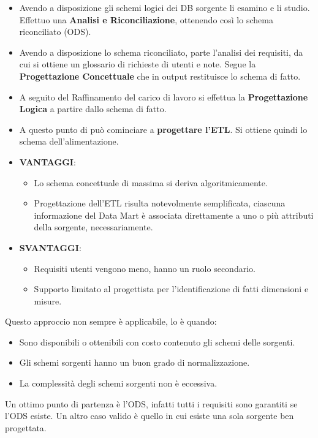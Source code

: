 \begin{itemize}
	\item Avendo a disposizione gli schemi logici dei DB sorgente li esamino e li studio. Effettuo una \textbf{Analisi e Riconciliazione}, ottenendo così lo schema riconciliato (ODS).
	\item Avendo a disposizione lo schema riconciliato, parte l'analisi dei requisiti, da cui si ottiene un glossario di richieste di utenti e note. Segue la \textbf{Progettazione Concettuale} che in output restituisce lo schema di fatto.
	\item A seguito del Raffinamento del carico di lavoro si effettua la \textbf{Progettazione Logica} a partire dallo schema di fatto.
	\item A questo punto di può cominciare a \textbf{progettare l'ETL}. Si ottiene quindi lo schema dell'alimentazione.
\end{itemize}
\begin{itemize}
	\item \textbf{VANTAGGI}:
	\begin{itemize}
		\item Lo schema concettuale di massima si deriva algoritmicamente.
		\item Progettazione dell'ETL risulta notevolmente semplificata, ciascuna informazione del Data Mart è associata direttamente a uno o più attributi della sorgente, necessariamente.
	\end{itemize}

	\item\textbf{SVANTAGGI}:
	\begin{itemize}
		\item Requisiti utenti vengono meno, hanno un ruolo secondario.
		\item Supporto limitato al progettista per l'identificazione di fatti dimensioni e misure.
	\end{itemize}
\end{itemize}
\noindent Questo approccio non sempre è applicabile, lo è quando:
\begin{itemize}
	\item Sono disponibili o ottenibili con costo contenuto gli schemi delle sorgenti.
	\item Gli schemi sorgenti hanno un buon grado di normalizzazione.
	\item La complessità degli schemi sorgenti non è eccessiva.
\end{itemize}
\noindent Un ottimo punto di partenza è l'ODS, infatti tutti i requisiti sono garantiti se l'ODS esiste. Un altro caso valido è quello in cui esiste una sola sorgente ben progettata.

